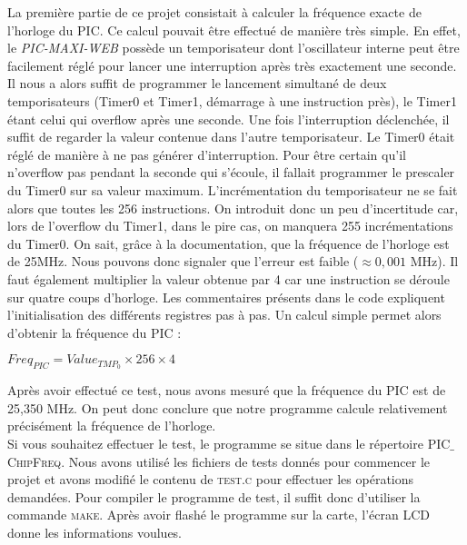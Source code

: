 La première partie de ce projet consistait à calculer la fréquence exacte de l'horloge du PIC. Ce calcul pouvait être effectué de manière très simple. En effet, le \textit{PIC-MAXI-WEB} possède un temporisateur dont l'oscillateur interne peut être facilement réglé pour lancer une interruption après très exactement une seconde. Il nous a alors suffit de programmer le lancement simultané de deux temporisateurs (Timer0 et Timer1, démarrage à une instruction près), le Timer1 étant celui qui overflow après une seconde. Une fois l'interruption déclenchée, il suffit de regarder la valeur contenue dans l'autre temporisateur. Le Timer0 était réglé de manière à ne pas générer d'interruption. Pour \^{e}tre certain qu'il n'overflow pas pendant la seconde qui s'écoule, il fallait programmer le prescaler du Timer0 sur sa valeur maximum. L'incrémentation du temporisateur ne se fait alors que toutes les 256 instructions. On introduit donc un peu d'incertitude car, lors de l'overflow du Timer1, dans le pire cas, on manquera 255 incrémentations du Timer0. On sait, grâce à la documentation, que la fréquence de l'horloge est de 25MHz. Nous pouvons donc signaler que l'erreur est faible ($\approx 0,001$ MHz). Il faut également multiplier la valeur obtenue par 4 car une instruction se déroule sur quatre coups d'horloge. Les commentaires présents dans le code expliquent l'initialisation des différents registres pas à pas. Un calcul simple permet alors d'obtenir la fréquence du PIC : \\
\begin{center}
$Freq_{PIC} = Value_{TMP_{0}} \times 256 \times 4$
\end{center}
Après avoir effectué ce test, nous avons mesuré que la fréquence du PIC est de 25,350 MHz. On peut donc conclure que notre programme calcule relativement précisément la fréquence de l'horloge. \\

Si vous souhaitez effectuer le test, le programme se situe dans le répertoire \textsc{PIC$\_$ChipFreq}. Nous avons utilisé les fichiers de tests donnés pour commencer le projet et avons modifié le contenu de \textsc{test.c} pour effectuer les opérations demandées. Pour compiler le programme de test, il suffit donc d'utiliser la commande \textsc{make}. Après avoir flashé le programme sur la carte, l'écran LCD donne les informations voulues.
